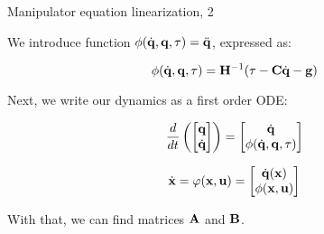 \documentclass{beamer}
\begin{document}
\begin{frame}{Manipulator equation linearization, 2}
	\begin{flushleft}
		
		We introduce function $\phi(\dot{\mathbf{q}}, \mathbf{q}, \tau) = \ddot{\mathbf{q}}$, expressed as:
		
		\begin{equation}
			\phi(\dot{\mathbf{q}}, \mathbf{q}, \tau) 
			=
			\mathbf{H}^{-1} (\tau - \mathbf{C} \dot{\mathbf{q}} - \mathbf{g} ) 
		\end{equation}
		
		Next, we write our dynamics as a first order ODE:
		
		\begin{equation}
			\frac{d}{dt} 
			\left(
			\begin{bmatrix}
				\mathbf{q} \\ \dot{\mathbf{q}} 
			\end{bmatrix}
			\right)
			=
			\begin{bmatrix}
				\dot{\mathbf{q}}  \\ 
				\phi(\dot{\mathbf{q}}, \mathbf{q}, \tau) 
			\end{bmatrix}
		\end{equation}
	
	\begin{equation}
	\dot{\mathbf{x}} 
	=
	\varphi(\mathbf{x}, \mathbf{u})
	=
	\begin{bmatrix}
		\dot{\mathbf{q}}(\mathbf{x})  \\ 
		\phi(\mathbf{x}, \mathbf{u}) 
	\end{bmatrix}
\end{equation}
		
		With that, we can find matrices $\mathbf{A}$ and $\mathbf{B}$.
		
	\end{flushleft}
\end{frame}
\end{document}
